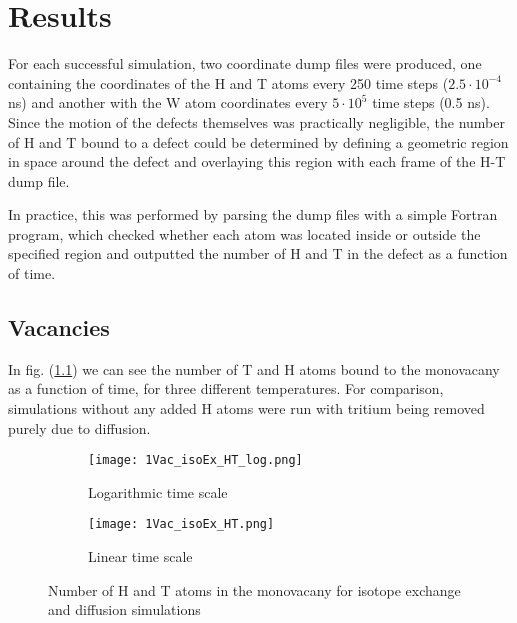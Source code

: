 \chapter{Results}

For each successful simulation, two coordinate dump files were produced, one containing the coordinates of the H and T atoms every 250 time steps ($2.5\cdot 10^{-4}$ ns) and another with the W atom coordinates every $5\cdot 10^5$ time steps (0.5 ns).
Since the motion of the defects themselves was practically negligible, the number of H and T bound to a defect could be determined by defining a geometric region in space around the defect and overlaying this region with each frame of the H-T dump file.

In practice, this was performed by parsing the dump files with a simple Fortran program, which checked whether each atom was located inside or outside the specified region and outputted the number of H and T in the defect as a function of time.

\section{Vacancies}
In fig. (\ref{Fig:1Vac_results}) we can see the number of T and H atoms bound to the monovacany as a function of time, for three different temperatures. 
For comparison, simulations without any added H atoms were run with tritium being removed purely due to diffusion. 

\begin{figure}[ht]
\begin{subfigure}{.5\textwidth}
  \centering
  \texttt{[image: 1Vac\_isoEx\_HT\_log.png]}  
  \caption{Logarithmic time scale}
\end{subfigure}
\begin{subfigure}{.5\textwidth}
  \centering
  \texttt{[image: 1Vac\_isoEx\_HT.png]}  
  \caption{Linear time scale}
\end{subfigure}
\caption{Number of H and T atoms in the monovacany for isotope exchange and diffusion simulations}
 \label{Fig:1Vac_results} 
\end{figure}


